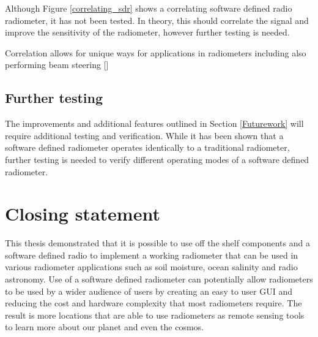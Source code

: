 Although Figure \ref{correlating_sdr} shows a correlating software defined radio radiometer, it has not been tested.  In theory, this should correlate the signal and improve the sensitivity of the radiometer, however further testing is needed.

Correlation allows for unique ways for applications in radiometers including also performing beam steering [\cite{villarino02}]

\subsection{Further testing}
The improvements and additional features outlined in Section \ref{Futurework} will require additional testing and verification.  While it has been shown that a software defined radiometer operates identically to a traditional radiometer, further testing is needed to verify different operating modes of a software defined radiometer.

\section{Closing statement}
This thesis demonstrated that it is possible to use off the shelf components and a software defined radio to implement a working radiometer that can be used in various radiometer applications such as soil moisture, ocean salinity and radio astronomy.  Use of a software defined radiometer can potentially allow radiometers to be used by a wider audience of users by creating an easy to user GUI and reducing the cost and hardware complexity that most radiometers require.  The result is more locations that are able to use radiometers as remote sensing tools to learn more about our planet and even the cosmos.
